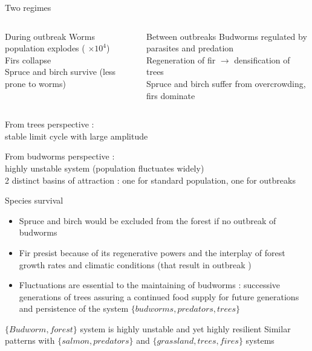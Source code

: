 \documentclass[11,aspectratio=1610]{beamer}
\begin{document}
\begin{frame}{Two regimes}


\begin{small}
\begin{columns}
  \begin{block}{\alert{During outbreak}} 
  Worms population explodes ( $\times 10^4$) \\
  Firs collapse\\ 
  Spruce and birch survive (less prone to worms)
  \end{block}
  \begin{block}{\alert{Between outbreaks}}
  Budworms regulated by parasites and predation\\
  Regeneration of fir $\rightarrow$ densification of trees\\
  Spruce and birch suffer from overcrowding, firs dominate 
  
  \end{block}
\end{columns}
\end{small}

\vfill

From trees perspective  :\\
 \alert{stable limit cycle}  with large amplitude

From budworms perspective : \\
  highly unstable system (population fluctuates widely)\\
 \alert{2 distinct basins} of attraction : one for standard population, one for outbreaks




\end{frame}
\begin{frame}{Species survival}


\begin{itemize} 
\item Spruce and birch would be excluded from the forest if no outbreak of budworms
\item Fir presist because of its regenerative powers and the interplay of forest growth rates and climatic conditions (that result in outbreak )
\item Fluctuations are essential to the maintaining of budworms : successive generations of trees assuring a continued food supply for future generations and persistence of the system $\{budworms, predators, trees\}$
\end{itemize}
\vfill
$\{Budworm, forest\}$ system is highly \alert{unstable} and yet highly \alert{resilient}
\vfill
Similar patterns with $\{salmon,predators\}$ and $\{grassland, trees, fires\}$  systems

\end{frame}
\end{document}
